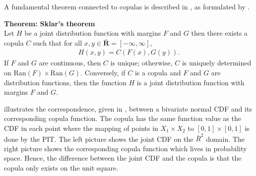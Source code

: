 A fundamental theorem connected to copulas is described in , as formulated by . 
\begin{theorem}\label{the:Sklars}
        \textbf{Theorem: Sklar's theorem} \\
        Let $H$ be a joint distribution function with margins $F$ and $G$ then there exists a copula $C$ such that for all $x,y \in \bar{\mathbf{R}} = \left[-\infty, \infty \right]$, 
        \begin{align}
            H(x,y) = C(F(x), G(y)). \label{eq:Sklar}
        \end{align}
        If $F$ and $G$ are continuous, then $C$ is unique; otherwise, $C$ is uniquely determined on $\mathrm{Ran}(F)\times\mathrm{Ran}(G)$. Conversely, if $C$ is a copula and $F$ and $G$ are distribution functions, then the function $H$ is a joint distribution function with margins $F$ and $G$.
\end{theorem}

 illustrates the correspondence, given in , between a bivariate normal \gls{CDF} and its corresponding copula function. The copula has the same function value as the \gls{CDF} in each point where the mapping of points in $X_1\times X_2$ to $[0,1]\times[0,1]$ is done by the \gls{PIT}. The left picture shows the joint \gls{CDF} on the $\bar{R}^2$ domain. The right picture shows the corresponding copula function which lives in probability space. Hence, the difference between the joint \gls{CDF} and the copula is that the copula only exists on the unit square. 

